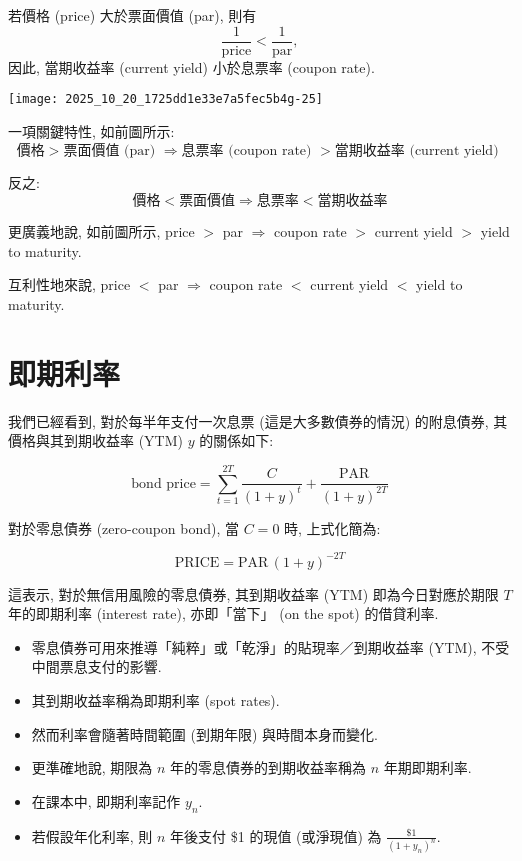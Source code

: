 \documentclass[letterpaper]{article}
\begin{document}
		
		若價格 (price) 大於票面價值 (par), 則有
		\[
		\frac{1}{\text{price}} < \frac{1}{\text{par}}, 
		\]
		因此, 當期收益率 (current yield) 小於息票率 (coupon rate).  
		
		
		\texttt{[image: 2025\_10\_20\_1725dd1e33e7a5fec5b4g-25]}
		
		
		一項關鍵特性, 如前圖所示:   
		\[
		\text{價格} > \text{票面價值  (par) } \Longrightarrow \text{息票率 (coupon rate) } > \text{當期收益率 (current yield) }
		\]
		
		反之:   
		\[
		\text{價格} < \text{票面價值} \Longrightarrow \text{息票率} < \text{當期收益率}
		\]
		
		更廣義地說, 如前圖所示, price $>$ par $\Longrightarrow$ coupon rate $>$ current yield $>$ yield to maturity.
		
		
		互利性地來說, price $<$ par $\Longrightarrow$ coupon rate $<$ current yield $<$ yield to maturity.
		
		\section{即期利率}
		我們已經看到, 對於每半年支付一次息票 (這是大多數債券的情況) 的附息債券, 其價格與其到期收益率 (YTM) \( y \) 的關係如下: 
		
		\[
		\text{bond price} = \sum_{t=1}^{2T} \frac{C}{ (1 + y) ^t} + \frac{\mathrm{PAR}}{ (1 + y) ^{2T}}
		\]
		
		對於零息債券 (zero-coupon bond), 當 \( C = 0 \) 時, 上式化簡為: 
		
		\[
		\text{PRICE} = \text{PAR} \,  (1 + y) ^{-2T}
		\]
		
		這表示, 對於無信用風險的零息債券, 其到期收益率 (YTM) 即為今日對應於期限 \( T \) 年的即期利率 (interest rate),  
		亦即「當下」 (on the spot) 的借貸利率.  
		
		
		\begin{itemize}
			\item 零息債券可用來推導「純粹」或「乾淨」的貼現率／到期收益率 (YTM), 不受中間票息支付的影響.
			\item 其到期收益率稱為即期利率 (spot rates).
			\item 然而利率會隨著時間範圍 (到期年限) 與時間本身而變化.
			\item 更準確地說, 期限為 $n$ 年的零息債券的到期收益率稱為 $n$ 年期即期利率.
			\item 在課本中, 即期利率記作 $y_{n}$.
			\item 若假設年化利率, 則 $n$ 年後支付 \$1 的現值 (或淨現值) 為 $\frac{\$1}{(1 + y_{n})^{n}}$.
		\end{itemize}
		
\end{document}
